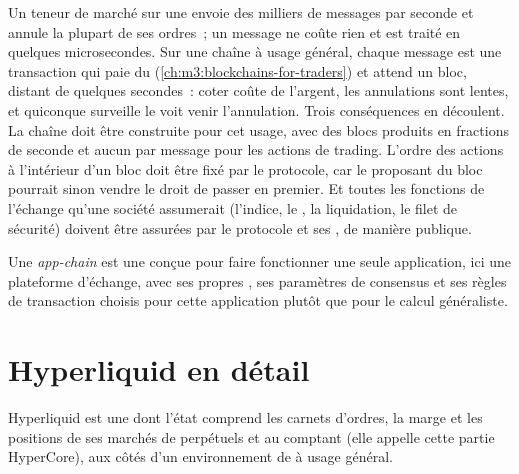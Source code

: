 Un teneur de marché sur une  envoie des milliers de messages par seconde et annule la plupart de ses
ordres~; un message ne coûte rien et est traité en quelques microsecondes. Sur une chaîne à usage général, chaque message
est une transaction qui paie du  (\cref{ch:m3:blockchains-for-traders}) et attend un bloc, distant de quelques secondes~:
coter coûte de l'argent, les annulations sont lentes, et quiconque surveille le  voit venir l'annulation. Trois
conséquences en découlent. La chaîne doit être construite pour cet usage, avec des blocs produits en fractions de seconde
et aucun  par message pour les actions de trading. L'ordre des actions à l'intérieur d'un bloc doit être fixé par le
protocole, car le proposant du bloc pourrait sinon vendre le droit de passer en premier. Et toutes les fonctions de
l'échange qu'une société assumerait (l'indice, le , la liquidation, le filet de sécurité) doivent être
assurées par le protocole et ses , de manière publique.

\begin{definition}\label{def:m3:on-chain-order-books-and-perpetual-dexs:appchain}
Une \emph{app-chain} est une  conçue pour faire fonctionner une seule application, ici une
plateforme d'échange, avec ses propres , ses paramètres de consensus et ses règles de transaction choisis pour
cette application plutôt que pour le calcul généraliste.
\end{definition}

\section{Hyperliquid en détail}

Hyperliquid est une  dont l'état comprend les carnets d'ordres, la marge et les positions de ses marchés de
perpétuels et au comptant (elle appelle cette partie HyperCore), aux côtés d'un environnement de  à usage général.

